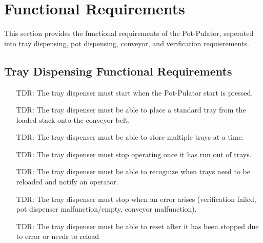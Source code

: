 \documentclass[12pt]{article}
\newcounter{tdreqnum} %
\newcounter{reqnum} %
\begin{document}
  \section{Functional Requirements}

  This section provides the functional requirements of the Pot-Pulator, seperated into tray dispensing,
  pot dispensing, conveyor, and verification requierements.
 
  \subsection{Tray Dispensing Functional Requirements}
  
  \noindent \begin{itemize}
  
  \item[TDR\refstepcounter{tdreqnum}\thetdreqnum \label{R_Tray0}:] {The tray dispenser must
      start when the Pot-Pulator start is pressed.}
  
  \item[TDR\refstepcounter{tdreqnum}\thetdreqnum \label{R_Tray1}:] {The tray dispenser must
      be able to place a standard tray from the loaded stack onto the conveyor belt.}
  
  \item[TDR\refstepcounter{tdreqnum}\thetdreqnum \label{R_Tray2}:] {The tray dispenser must
        be able to store multiple trays at a time.}
  
  \item[TDR\refstepcounter{tdreqnum}\thetdreqnum \label{R_Tray5}:] {The tray dispenser must
      stop operating once it has run out of trays.}
  
  \item[TDR\refstepcounter{tdreqnum}\thetdreqnum \label{R_Tray6}:] {The tray dispenser must
      be able to recognize when trays need to be reloaded and notify an operator.}
  
  \item[TDR\refstepcounter{tdreqnum}\thetdreqnum \label{R_Tray7}:] {The tray dispenser must
       stop when an error arises (verification failed, pot dispenser malfunction/empty, conveyor
       malfunction).}
  
  \item[TDR\refstepcounter{tdreqnum}\thetdreqnum \label{R_Tray8}:] {The tray dispenser must
      be able to reset after it has been stopped due to error or needs to reload}
  
  
  \end{itemize}
  
\end{document}

